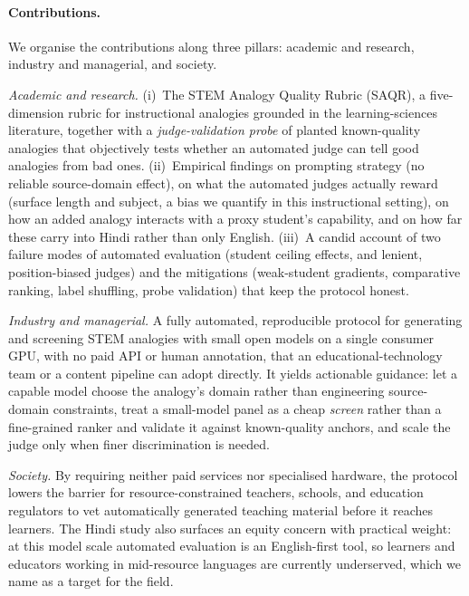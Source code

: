 \documentclass[11pt]{article}
\begin{document}
\paragraph{Contributions.} We organise the contributions along three pillars: academic and
research, industry and managerial, and society.

\emph{Academic and research.} (i)~The STEM Analogy Quality Rubric (SAQR), a five-dimension rubric
for instructional analogies grounded in the learning-sciences literature, together with a
\emph{judge-validation probe} of planted known-quality analogies that objectively tests whether an
automated judge can tell good analogies from bad ones. (ii)~Empirical findings on prompting strategy
(no reliable source-domain effect), on what the automated judges actually reward (surface length and
subject, a bias we quantify in this instructional setting), on how an added analogy interacts with a
proxy student's capability, and on how far these carry into Hindi rather than only English.
(iii)~A candid account of two failure modes of automated evaluation (student ceiling effects, and
lenient, position-biased judges) and the mitigations (weak-student gradients, comparative ranking,
label shuffling, probe validation) that keep the protocol honest.

\emph{Industry and managerial.} A fully automated, reproducible protocol for generating and
screening STEM analogies with small open models on a single consumer GPU, with no paid API or human
annotation, that an educational-technology team or a content pipeline can adopt directly. It yields
actionable guidance: let a capable model choose the analogy's domain rather than engineering
source-domain constraints, treat a small-model panel as a cheap \emph{screen} rather than a
fine-grained ranker and validate it against known-quality anchors, and scale the judge only when
finer discrimination is needed.

\emph{Society.} By requiring neither paid services nor specialised hardware, the protocol lowers the
barrier for resource-constrained teachers, schools, and education regulators to vet automatically
generated teaching material before it reaches learners. The Hindi study also surfaces an equity
concern with practical weight: at this model scale automated evaluation is an English-first tool, so
learners and educators working in mid-resource languages are currently underserved, which we name as
a target for the field.
\end{document}
